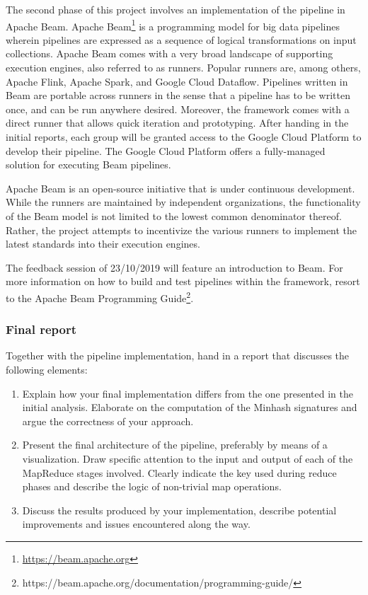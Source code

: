\documentclass[11pt]{article}
\theoremstyle{definition}
\begin{document}
The second phase of this project involves an implementation of the pipeline in Apache Beam. Apache Beam\footnote{\url{https://beam.apache.org}} is a programming model for big data pipelines wherein pipelines are expressed as a sequence of logical transformations on input collections. Apache Beam comes with a very broad landscape of supporting execution engines, also referred to as runners. Popular runners are, among others, Apache Flink, Apache Spark, and Google Cloud Dataflow. Pipelines written in Beam are portable across runners in the sense that a pipeline has to be written once, and can be run anywhere desired. Moreover, the framework comes with a direct runner that allows quick iteration and prototyping. After handing in the initial reports, each group will be granted access to the Google Cloud Platform to develop their pipeline. The Google Cloud Platform offers a fully-managed solution for executing Beam pipelines.

Apache Beam is an open-source initiative that is under continuous development. While the runners are maintained by independent organizations, the functionality of the Beam model is not limited to the lowest common denominator thereof. Rather, the project attempts to incentivize the various runners to implement the latest standards into their execution engines.

The feedback session of 23/10/2019 will feature an introduction to Beam. For more information on how to build and test pipelines within the framework, resort to the Apache Beam Programming Guide\footnote{https://beam.apache.org/documentation/programming-guide/}.

\clearpage

\subsubsection{Final report}

Together with the pipeline implementation, hand in a report that discusses the following elements:

\begin{enumerate}[label=\textbf{\arabic*}.]
	\item Explain how your final implementation differs from the one presented in the initial analysis. Elaborate on the computation of the Minhash signatures and argue the correctness of your approach.
		
	\item Present the final architecture of the pipeline, preferably by means of a visualization. Draw specific attention to the input and output of each of the MapReduce stages involved. Clearly indicate the key used during reduce phases and describe the logic of non-trivial map operations.
	
	\item Discuss the results produced by your implementation, describe potential improvements and issues encountered along the way.
\end{enumerate}
\end{document}
